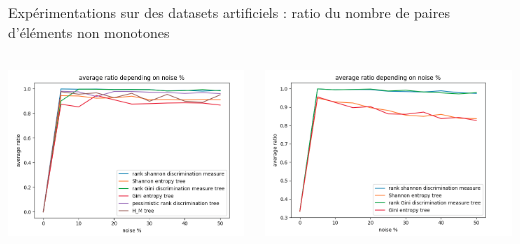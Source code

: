\documentclass[usenames,dvipsnames]{beamer}
\begin{document}
\begin{frame}{Expérimentations sur des datasets artificiels : ratio du nombre de paires d'éléments non monotones}
    \begin{columns}
        \begin{column}{0.45\textwidth}
            \centering
            \includegraphics[width=\textwidth]{ratio_2.png}
        \end{column}
        \begin{column}{0.45\textwidth}
            \centering
            \includegraphics[width=\textwidth]{ratio_3.png}
        \end{column}
    \end{columns}
    \begin{columns}
        \begin{column}{0.45\textwidth}
            \centering

\end{column}
\end{columns}
\end{frame}
\end{document}
